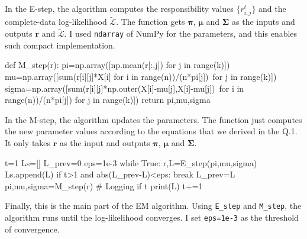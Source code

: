 \documentclass[11pt]{article}
\begin{document}
In the E-step, the algorithm computes the responsibility values $\{r_{i,j}^{t}\}$ and the complete-data log-likelihood $\tilde{\mathcal{L}}$. The function gets  $\bm\pi$, $\bm\mu$ and $\bm\Sigma$ as the inputs and outputs $\bm r$ and $\tilde{\mathcal{L}}$. I used \texttt{ndarray} of NumPy for the parameters, and this enables such compact implementation.
\begin{pythoncode*}{}
def M_step(r):
    pi=np.array([np.mean(r[:,j]) for j in range(k)])
    mu=np.array([sum(r[i][j]*X[i] for i in range(n))/(n*pi[j])\
                                            for j in range(k)])
    sigma=np.array([sum(r[i][j]*np.outer(X[i]-mu[j],X[i]-mu[j])\
                for i in range(n))/(n*pi[j]) for j in range(k)])
    return pi,mu,sigma
\end{pythoncode*}
In the M-step, the algorithm updates the parameters. The function just computes the new parameter values according to the equations that we derived in the Q.1. It only takes $\bm r$ as the input and outputs $\bm\pi$, $\bm\mu$ and $\bm\Sigma$.
\begin{pythoncode*}{}
t=1
Ls=[]
L_prev=0
eps=1e-3
while True:
    r,L=E_step(pi,mu,sigma)
    Ls.append(L)
    if t>1 and abs(L_prev-L)<eps:
        break
    L_prev=L
    pi,mu,sigma=M_step(r)
    # Logging
    if t%
        print(L)
    t+=1
\end{pythoncode*}
Finally, this is the main part of the EM algorithm. Using \texttt{E\_step} and \texttt{M\_step}, the algorithm runs until the log-likelihood converges. I set \texttt{eps=1e-3} as the threshold of convergence.
\end{document}
